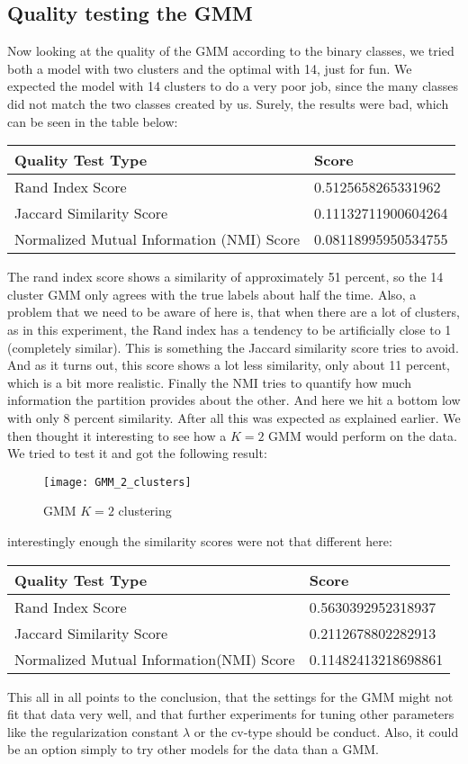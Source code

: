 \subsection{Quality testing the GMM}
Now looking at the quality of the GMM according to the binary classes, we tried both a model with two clusters and the optimal with 14, just for fun. We expected the model with 14 clusters to do a very poor job, since the many classes did not match the two classes created by us. Surely, the results were bad, which can be seen in the table below:

\begin{table}[H]
	\centering
	\begin{tabular}{|l|l|}
		\hline
		\textbf{Quality Test Type} & \textbf{Score} \\
		\hline
		Rand Index Score & 0.5125658265331962\\
		Jaccard Similarity Score & 0.11132711900604264\\
		Normalized Mutual Information (NMI) Score & 0.08118995950534755\\
		\hline
	\end{tabular}
\end{table}
\noindent
The rand index score shows a similarity of approximately 51 percent, so the 14 cluster GMM only agrees with the true labels about half the time. Also, a problem that we need to be aware of here is, that when there are a lot of clusters, as in this experiment, the Rand index has a tendency to be artificially close to 1 (completely similar). This is something the Jaccard similarity score tries to avoid. And as it turns out, this score shows a lot less similarity, only about 11 percent, which is a bit more realistic. Finally the NMI tries to quantify how much information the partition provides about the other. And here we hit a bottom low with only 8 percent similarity. After all this was expected as explained earlier. We then thought it interesting to see how a $ K=2 $ GMM would perform on the data.
We tried to test it and got the following result:
\begin{figure}[H]
	\centering
	\texttt{[image: GMM\_2\_clusters]}
	\caption{GMM $ K=2 $ clustering}\label{fig:PCA}
\end{figure}\noindent
interestingly enough the similarity scores were not that different here:
\begin{table}[H]
	\centering
	\begin{tabular}{|l|l|}
		\hline
		\textbf{Quality Test Type} & \textbf{Score} \\
		\hline
		Rand Index Score & 0.5630392952318937\\
		Jaccard Similarity Score & 0.2112678802282913\\
		Normalized Mutual Information(NMI) Score & 0.11482413218698861\\
		\hline
	\end{tabular}
\end{table}
\noindent
This all in all points to the conclusion, that the settings for the GMM might not fit that data very well, and that further experiments for tuning other parameters like the regularization constant $\lambda$ or the cv-type should be conduct. Also, it could be an option simply to try other models for the data than a GMM.